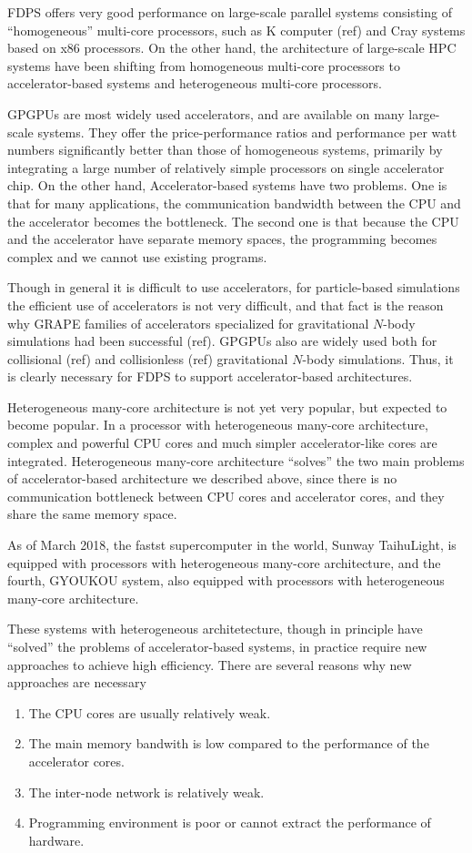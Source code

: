 \documentclass[]{pasj01}
\begin{document}
FDPS offers very good performance on large-scale parallel systems
consisting of ``homogeneous'' multi-core processors, such as K
computer (ref) and Cray systems based on x86 processors. On the other
hand, the architecture of large-scale HPC systems have been shifting
from homogeneous multi-core processors to accelerator-based systems
and heterogeneous multi-core processors.

GPGPUs are most widely used accelerators, and are available on many
large-scale systems. They offer the price-performance ratios and
performance per watt numbers significantly better than those of
homogeneous systems, primarily by integrating a large number of
relatively simple processors on single accelerator chip.  On the other
hand, Accelerator-based systems have two problems. One is that for
many applications, the communication bandwidth between the CPU and the
accelerator becomes the bottleneck. The second one is that because the
CPU and the accelerator have separate memory spaces, the programming
becomes complex and we cannot use existing programs.

Though in general it is difficult to use accelerators, for
particle-based simulations the efficient use of accelerators is not
very difficult, and that fact is the reason why GRAPE families of
accelerators specialized for gravitational $N$-body simulations had
been successful (ref).  GPGPUs also are widely used both for
collisional (ref) and collisionless (ref) gravitational $N$-body
simulations. Thus, it is clearly necessary for FDPS to support
accelerator-based architectures.

Heterogeneous many-core architecture is not yet very popular, but
expected to become popular. In a processor with heterogeneous
many-core architecture, complex and powerful CPU cores and much
simpler accelerator-like cores are integrated.
Heterogeneous many-core architecture ``solves'' the two
main problems of accelerator-based architecture we described above,
since there is no communication bottleneck between CPU cores and
accelerator cores, and they share the same memory space. 

As of March 2018, the fastst supercomputer
in the world, Sunway TaihuLight, is equipped with processors with
heterogeneous many-core architecture, and the fourth, GYOUKOU system,
also equipped with processors with heterogeneous many-core
architecture. 

These systems with heterogeneous architetecture, though in principle
have ``solved'' the problems of accelerator-based systems, in practice
require new approaches to achieve high efficiency. There are several
reasons why new approaches are necessary
\begin{enumerate}

\item The CPU cores are usually relatively weak.
\item The main memory bandwith is low compared to the performance of
  the accelerator cores.
\item The inter-node network is relatively weak.
\item Programming environment is poor or cannot extract the
  performance of hardware.
\end{enumerate}
\end{document}
